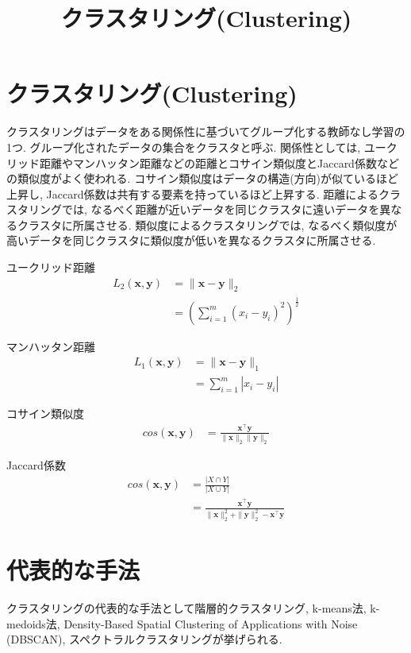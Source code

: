 \documentclass[dvipdfmx, 10pt]{jsarticle}
\title{\textbf{クラスタリング(Clustering)}}
\author{}
\date{}
\begin{document}
\maketitle

\section*{クラスタリング(Clustering)}
クラスタリングはデータをある関係性に基づいてグループ化する教師なし学習の1つ. グループ化されたデータの集合をクラスタと呼ぶ. 
関係性としては, ユークリッド距離やマンハッタン距離などの距離とコサイン類似度とJaccard係数などの類似度がよく使われる. 
コサイン類似度はデータの構造(方向)が似ているほど上昇し, Jaccard係数は共有する要素を持っているほど上昇する. 
距離によるクラスタリングでは, なるべく距離が近いデータを同じクラスタに遠いデータを異なるクラスタに所属させる. 
類似度によるクラスタリングでは, なるべく類似度が高いデータを同じクラスタに類似度が低いを異なるクラスタに所属させる. 

\begin{oframed}
\noindent
ユークリッド距離
\begin{align*}
    L_2(\mathbf{x}, \mathbf{y}) 
    &= \|\mathbf{x} - \mathbf{y}\|_2\\
    &= (\sum_{i=1}^{m} (x_i - y_i)^2)^{\frac{1}{2}}
\end{align*}

\noindent
マンハッタン距離
\begin{align*}
    L_1(\mathbf{x}, \mathbf{y}) 
    &= \|\mathbf{x} - \mathbf{y}\|_1\\
    &= \sum_{i=1}^{m} |x_i - y_i|
\end{align*}

\noindent
コサイン類似度
\begin{align*}
    cos(\mathbf{x}, \mathbf{y}) 
    &= \frac{\mathbf{x}^{\top}\mathbf{y}}{\|\mathbf{x}\|_2  \|\mathbf{y}\|_2}
\end{align*}

\noindent
Jaccard係数
\begin{align*}
    cos(\mathbf{x}, \mathbf{y}) 
    &= \frac{|X \cap Y|}{|X \cup Y|}\\ 
    &= \frac{\mathbf{x}^{\top}\mathbf{y}}{\|\mathbf{x}\|_2^2 + \|\mathbf{y}\|_2^2 - \mathbf{x}^{\top}\mathbf{y}}
\end{align*}

\end{oframed}

\section*{代表的な手法}
クラスタリングの代表的な手法として階層的クラスタリング, k-means法, k-medoids法, 
Density-Based Spatial Clustering of Applications with Noise (DBSCAN), スペクトラルクラスタリングが挙げられる. 
\end{document}
